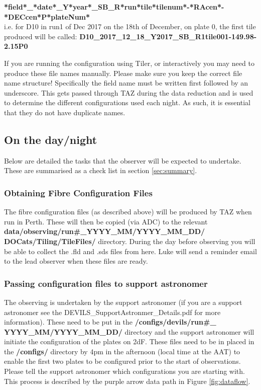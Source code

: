 \documentclass[12pt]{article}
\begin{document}
\hspace{5mm} \textbf{*field*\_*date*\_Y*year*\_SB\_R*run*tile*tilenum*-*RAcen*-*DECcen*P*plateNum*} \\


i.e. for D10 in run1 of Dec 2017 on the 18th of December, on plate 0, the first tile produced will be called:  \textbf{D10\_2017\_12\_18\_Y2017\_SB\_R1tile001-149.98-2.15P0}

If you are running the configuration using Tiler, or interactively you may need to produce these file names manually. Please make sure you keep the correct file name structure! Specifically the field name must be written first followed by an underscore. This gets passed through TAZ during the data reduction and is used to determine the different configurations used each night. As such, it is essential that they do not have duplicate names.  



\subsection{On the day/night}

Below are detailed the tasks that the observer will be expected to undertake. These are summarised as a check list in section \ref{sec:summary}.

\subsubsection{Obtaining Fibre Configuration Files}

The fibre configuration files (as described above) will be produced by TAZ when run in Perth. These will then be copied (via ADC) to the relevant \textbf{data/observing/run\#\_YYYY\_MM/YYYY\_MM\_DD/ \\
DOCats/Tiling/TileFiles/} directory. During the day before observing you will be able to collect the .fld and .sds files from here. Luke will send a reminder email to the lead observer when these files are ready. 

\subsubsection{Passing configuration files to support astronomer}

The observing is undertaken by the support astronomer (if you are a support astronomer see the DEVILS\_SupportAstronmer\_Details.pdf for more information). These need to be put in the \textbf{/configs/devils/run\#\_
YYYY\_MM/YYYY\_MM\_DD/} directory and the support astronomer will initiate the configuration of the plates on 2dF. These files need to be in placed in the \textbf{/configs/} directory by 4pm in the afternoon (local time at the AAT) to enable the first two plates to be configured prior to the start of observations. Please tell the support astronomer which configurations you are starting with. This process is described by the purple arrow data path in Figure \ref{fig:dataflow}. 
\end{document}
